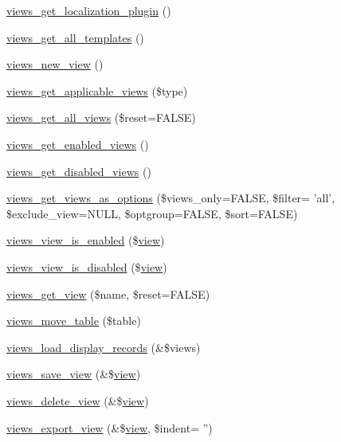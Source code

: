 \begin{DoxyCompactItemize}
\item 
\hyperlink{views_8module_a21a516eefab3dad9e882299d604a3aee}{views\_\-get\_\-localization\_\-plugin} ()
\item 
\hyperlink{views_8module_a1acf51b07678da9f1bbf608f11099e80}{views\_\-get\_\-all\_\-templates} ()
\item 
\hyperlink{views_8module_a6ebd20c8c63a43de53643809db0fd1f5}{views\_\-new\_\-view} ()
\item 
\hyperlink{views_8module_aa014d34aca90095935b24f3a6f49bb4a}{views\_\-get\_\-applicable\_\-views} (\$type)
\item 
\hyperlink{views_8module_ab1f0b4d2bc5c4a7db19554780f5779ea}{views\_\-get\_\-all\_\-views} (\$reset=FALSE)
\item 
\hyperlink{views_8module_a8c21a5392230ac4dce7091e5031f3c93}{views\_\-get\_\-enabled\_\-views} ()
\item 
\hyperlink{views_8module_aa1fc003dbf7d8e16d0b3861be577afc4}{views\_\-get\_\-disabled\_\-views} ()
\item 
\hyperlink{views_8module_a8a6a958634c7fee2a5ae780bc306295a}{views\_\-get\_\-views\_\-as\_\-options} (\$views\_\-only=FALSE, \$filter= 'all', \$exclude\_\-view=NULL, \$optgroup=FALSE, \$sort=FALSE)
\item 
\hyperlink{views_8module_a2d707888904ef7d6d0c54ff7802f8cd9}{views\_\-view\_\-is\_\-enabled} (\$\hyperlink{classview}{view})
\item 
\hyperlink{views_8module_afba08d9328467943ebfec0a583ecb214}{views\_\-view\_\-is\_\-disabled} (\$\hyperlink{classview}{view})
\item 
\hyperlink{views_8module_add8b65aa3fa72b8a6f89e5ff314e42c0}{views\_\-get\_\-view} (\$name, \$reset=FALSE)
\item 
\hyperlink{views_8module_a06896a9ace9eb509293d9d915710562d}{views\_\-move\_\-table} (\$table)
\item 
\hyperlink{views_8module_a5ba50dc2afc437f2faf7d956d6488eb1}{views\_\-load\_\-display\_\-records} (\&\$views)
\item 
\hyperlink{views_8module_a7de4aba561f47e86e405f5519a0d3dfe}{views\_\-save\_\-view} (\&\$\hyperlink{classview}{view})
\item 
\hyperlink{views_8module_a1eeaff33304db50bde3466466d1bfc2d}{views\_\-delete\_\-view} (\&\$\hyperlink{classview}{view})
\item 
\hyperlink{views_8module_aaf41a0a8cdaaa95df87a8287b68fbb12}{views\_\-export\_\-view} (\&\$\hyperlink{classview}{view}, \$indent= '')
\item 

\end{DoxyCompactItemize}
